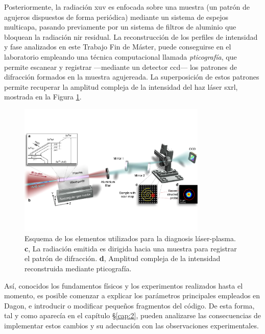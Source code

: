 Posteriormente, la radiación \acrshort{xuv} es enfocada sobre una muestra (un patrón de agujeros dispuestos de forma periódica) mediante un sistema de espejos multicapa\autocite{Tuitje2020}, pasando previamente por un sistema de filtros de aluminio que bloquean la radiación \acrshort{nir} residual. La reconstrucción de los perfiles de intensidad y fase analizados en este Trabajo Fin de Máster, puede conseguirse en el laboratorio empleando una técnica computacional llamada \emph{pticografía}, que permite escanear y registrar ---mediante un detector \acrshort{ccd}--- los patrones de difracción formados en la muestra agujereada. La superposición de estos patrones permite recuperar la amplitud compleja de la intensidad del haz láser \acrshort{sxrl}, mostrada en la Figura \ref{fig:3.7}.

\begin{figure}[htbp]
  \centering
  \includegraphics[width=0.8\textwidth]{Figuras/ch3_exper2.pdf}
  \caption{Esquema de los elementos\autocite{Tuitje2020} utilizados para la diagnosis láser-plasma. \textbf{c}, La radiación emitida es dirigida hacia una muestra para registrar el patrón de difracción. \textbf{d}, Amplitud compleja de la intensidad reconstruida mediante pticografía.}
  \label{fig:3.7}
\end{figure}

Así, conocidos los fundamentos físicos y los experimentos realizados hasta el momento, es posible comenzar a explicar los parámetros principales empleados en Dagon, e introducir o modificar pequeños fragmentos del código. De esta forma, tal y como aparecía en el capítulo \S\ref{cap:2}, pueden analizarse las consecuencias de implementar estos cambios y su adecuación con las observaciones experimentales.

